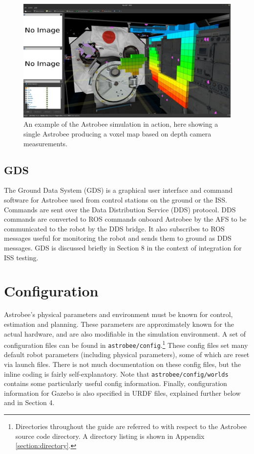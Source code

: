 \documentclass{article}
\begin{document}
\begin{figure}
    \centering
    \includegraphics[width=\textwidth]{img/sim.jpg}
    \caption{An example of the Astrobee simulation in action, here showing a single Astrobee producing a voxel map based on depth camera measurements.}
    \label{fig:sim}
\end{figure}

\subsection{GDS}
The Ground Data System (GDS) is a graphical user interface and command software for Astrobee used from control stations on the ground or the ISS. Commands are sent over the  Data Distribution Service (DDS) protocol. DDS commands are converted to ROS commands onboard Astrobee by the AFS to be communicated to the robot by the DDS bridge. It also subscribes to ROS messages useful for monitoring the robot and sends them to ground as DDS messages. GDS is discussed briefly in Section 8 in the context of integration for ISS testing.

\clearpage
\section{Configuration}

Astrobee's physical parameters and environment must be known for control, estimation and planning. These parameters are approximately known for the actual hardware, and are also modifiable in the simulation environment. A set of configuration files can be found in \texttt{astrobee/config}.\footnote{Directories throughout the guide are referred to with respect to the Astrobee source code directory. A directory listing is shown in Appendix \ref{section:directory}.} These config files set many default robot parameters (including physical parameters), some of which are reset via launch files. There is not much documentation on these config files, but the inline coding is fairly self-explanatory. Note that \texttt{astrobee/config/worlds} contains some particularly useful config information. Finally, configuration information for Gazebo is also specified in URDF files, explained further below and in Section 4.
\end{document}
